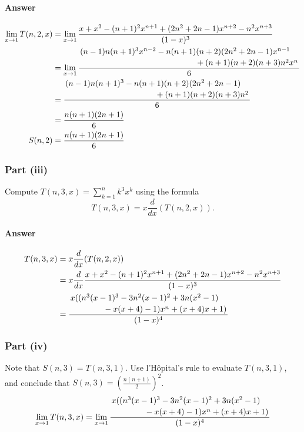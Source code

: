 \paragraph{Answer}
\begin{align*}
    \lim_{x \rightarrow 1} T(n, 2, x)
        &= \lim_{x \rightarrow 1} \frac{x + x^2 - (n + 1)^2 x^{n + 1} +
            (2n^2 + 2 n - 1) x^{n + 2} - n^2 x^{n + 3}}{(1 - x)^3} \\
        &= \lim_{x \rightarrow 1} \frac{\splitdfrac{(n - 1) n (n + 1)^3
            x^{n - 2} - n (n + 1)(n + 2)(2 n^2 + 2 n - 1) x^{n - 1}}{+
            (n + 1)(n + 2)(n + 3) n^2 x^n}}{6} \\
        &= \frac{\splitdfrac{(n - 1) n (n + 1)^3 - n(n + 1)(n + 2)(2 n^2 +
            2 n - 1)}{+ (n + 1)(n + 2)(n + 3) n^2}}{6} \\
        &= \frac{n (n + 1) (2 n + 1)}{6} \\
    S(n, 2) &= \frac{n (n + 1) (2 n + 1)}{6} \\
\end{align*}

\subsubsection{Part (iii)}
Compute $ T(n,3,x) = \sum_{k=1}^{n} k^3 x^k $ using the formula
\begin{equation*}
    T(n, 3, x) = x \frac{d}{dx} (T(n, 2, x)).
\end{equation*}

\paragraph{Answer}
\begin{align*}
    T(n, 3, x)
        &= x \frac{d}{dx} (T(n, 2, x)) \\
        &= x \frac{d}{dx} \frac{x + x^2 - (n + 1)^2 x^{n + 1} +
            (2 n^2 + 2 n - 1) x^{n + 2} - n^2 x^{n + 3}}{(1 - x)^3}\\
        &= \frac{\splitdfrac{x((n^3 (x - 1)^3 - 3 n^2 (x - 1)^2 +
            3 n (x^2 - 1)}{- x (x + 4) - 1) x^n + (x + 4) x + 1)}}{(1 - x)^4}
\end{align*}

\subsubsection{Part (iv)}
Note that $ S(n,3) = T(n,3,1) $.
Use l'H\^{o}pital's rule to evaluate $ T(n,3,1) $, and conclude that
    $ S(n,3) = \left( \frac{n(n+1)}{2} \right)^2 $.
\begin{align*}
    \lim_{x \rightarrow 1} T(n, 3, x)
        &= \lim_{x \rightarrow 1} \frac{\splitdfrac{x((n^3 (x - 1)^3 -
            3 n^2 (x - 1)^2 + 3 n (x^2 - 1)}{- x (x + 4) - 1) x^n + (x + 4) x +
            1)}}{(1 - x)^4} \\
\end{align*}


